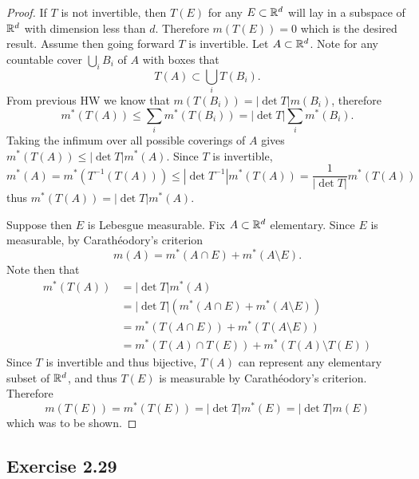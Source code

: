 \documentclass[hw_all.tex]{subfiles}
\begin{document}
\begin{proof}
    If $T$ is not invertible, then $T(E)$ for any $E \subset \mathbb{R}^d$ will lay in a subspace of $\mathbb{R}^d$ with dimension less than $d$. Therefore $m(T(E)) = 0$ which is the desired result. Assume then going forward $T$ is invertible. Let $A \subset \mathbb{R}^d$. Note for any countable cover $\bigcup_{i} B_i$ of $A$ with boxes that
    \[
        T(A) \subset \bigcup_{i} T(B_i)
    .\]
    From previous HW we know that $m(T(B_i)) = |\det T| m(B_i)$, therefore
    \[
        m^*(T(A)) \leq \sum_{i} m^*(T(B_i)) = |\det T| \sum_{i} m^*(B_i)
    .\]
    Taking the infimum over all possible coverings of $A$ gives $m^*(T(A)) \leq |\det T| m^*(A)$. Since $T$ is invertible,
    \[
        m^*(A) = m^*(T^{-1}(T(A))) \leq |\det T^{-1}| m^*(T(A)) = \frac{1}{|\det T|} m^*(T(A))
    \]
    thus $m^*(T(A)) = |\det T| m^*(A)$.

    Suppose then $E$ is Lebesgue measurable. Fix $A \subset \mathbb{R}^d$ elementary. Since $E$ is measurable, by Carath\'eodory's criterion 
    \[
        m(A) = m^*(A \cap E) + m^*(A \setminus E)
    .\]
    Note then that
    \begin{align*}
        m^*(T(A)) &= |\det T|m^*(A) \\
                  &= |\det T|(m^*(A \cap E) + m^*(A \setminus E)) \\
                  &= m^*(T(A \cap E)) + m^*(T(A \setminus E)) \\
                  &= m^*(T(A) \cap T(E)) + m^*(T(A) \setminus T(E))
    \end{align*}
    Since $T$ is invertible and thus bijective, $T(A)$ can represent any elementary subset of $\mathbb{R}^d$, and thus $T(E)$ is measurable by Carath\'eodory's criterion. Therefore
    \[
        m(T(E)) = m^*(T(E)) = |\det T| m^*(E) = |\det T| m(E)
    \]
    which was to be shown.
\end{proof}

\subsection{Exercise 2.29}
\end{document}
